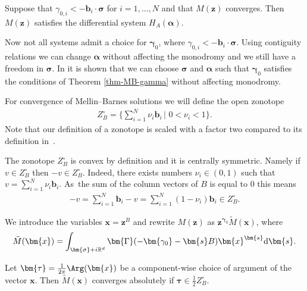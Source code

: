 \begin{Theorem}\label{thm-MB-gamma}%
Suppose that $\gamma_{0,i} < - \bm{b}_i \cdot \bm{\sigma}$ for
$i = 1,\dots,N$ and that $M(\bm{z})$ converges. Then $M(\bm{z})$ satisfies the differential system $H_{A}(\bm{\alpha})$.
\end{Theorem}
Now not all systems admit a choice for $\bm{\gamma}_0$, where $\gamma_{0,i} < - \bm{b}_i \cdot \bm{\sigma}$. Using contiguity relations we can change $\bm{\alpha}$ without affecting the monodromy and we still have a freedom in $\bm{\sigma}$.
In \cite{Beu13} it is shown that we can choose $\bm{\sigma}$ and $\bm{\alpha}$ such that $\bm{\gamma}_0$ satisfies the conditions of Theorem \ref{thm-MB-gamma} without affecting monodromy.

For convergence of Mellin--Barnes solutions we will define the open zonotope
\begin{gather*}
Z_B^{\circ} = \Bigg\{\sum_{i=1}^N \nu_i \bm{b}_i\,\bigg|\,\, 0 < \nu_i < 1\bigg\}.
\end{gather*}
Note that our definition of a zonotope is scaled with a factor two compared to its definition in~{\rm \cite{Beu13}}.

\begin{Remark}
\label{rem-zonotope-sym}
The zonotope $Z_B^{\circ}$ is convex by definition and it is centrally symmetric. Namely if $v \in Z_B^{\circ}$ then $-v \in Z_B^{\circ}$. Indeed, there exists numbers $\nu_i \in (0,1)$ such that $v = \sum_{i=1}^N \nu_i\bm{b}_i$. As~the sum of the column vectors of $B$ is equal to $0$ this means \begin{gather*}
-v = \sum_{i=1}^{N} \bm{b}_i - v = \sum_{i=1}^N (1 - \nu_i)\bm{b}_i \in Z_B^{\circ}.
\end{gather*}
\end{Remark}
We introduce the variables $\bm{x}=\bm{z}^B$ and rewrite $M(\bm{z})$ as
$\bm{z}^{\bm\gamma_0}\tilde{M}(\bm{x})$, where
\begin{gather*}
\tilde{M}(\bm{x})=\int_{\bm{\sigma} + i\mathbb{R}^d} \bm{\Gamma}(-\bm{\gamma_0}-\bm{s}B)
\bm{x}^{\bm{s}} {\rm d} \bm{s}.
\end{gather*}
\begin{Theorem} %
Let $\bm{\tau} = \frac{1}{2\pi}\Arg(\bm{x})$ be a component-wise choice of argument of the vector $\bm{x}$. Then $\tilde{M}(\bm{x})$ converges absolutely if
$\bm{\tau} \in \frac{1}{2}Z_B^{\circ}$.
\end{Theorem}

